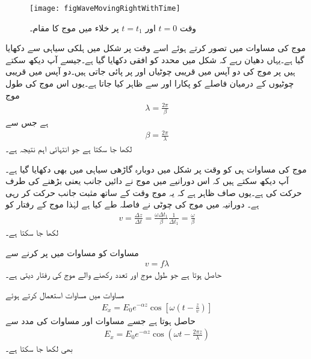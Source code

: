 \begin{figure}
\centering
\texttt{[image: figWaveMovingRightWithTime]}
\caption{وقت $t=0$ اور $t=t_1$ پر خلاء میں موج کا مقام۔}
\label{شکل_موج_وقت_کے_ساتھ_مثبت_چلتی_موج}
\end{figure}


موج کی مساوات  میں  تصور کرتے ہوئے اسے وقت  پر شکل  میں ہلکی سیاہی سے دکھایا گیا ہے۔یہاں دھیان رہے کہ شکل میں  محدد کو افقی دکھایا گیا ہے۔جیسے آپ دیکھ سکتے ہیں  پر موج کی دو آپس میں قریبی چوٹیاں  اور  پر پائی جاتی ہیں۔دو آپس میں قریبی چوٹیوں کے درمیان فاصلے کو  پکارا اور  سے ظاہر کیا جاتا ہے۔یوں اس موج کی طول موج
\begin{align}\label{مساوات_موج_زاویائی_مستقل_اور_طول_موج_الف}
\lambda=\frac{2\pi}{\beta}
\end{align}
ہے جس سے
\begin{align}\label{مساوات_موج_زاویائی_مستقل_اور_طول_موج_ب}
\beta=\frac{2\pi}{\lambda}
\end{align}
لکھا جا سکتا ہے جو انتہائی اہم نتیجہ ہے۔

موج کی مساوات ہی کو وقت  پر شکل  میں دوبارہ گاڑھی سیاہی میں بھی دکھایا گیا ہے۔آپ دیکھ سکتے ہیں کہ اس دورانیے میں موج نے دائیں جانب یعنی  بڑھنے کی طرف حرکت کی ہے۔یوں صاف ظاہر ہے کہ یہ موج وقت کے ساتھ مثبت  جانب حرکت کر رہی ہے۔ دورانیہ  میں موج کی چوٹی نے  فاصلہ طے کیا ہے لہٰذا موج کے رفتار کو
\begin{align}\label{مساوات_موج_رفتار_اور_تعدد}
v=\frac{\Delta z}{\Delta t}=\frac{\omega \Delta t_1}{\beta} \frac{1}{\Delta t_1}=\frac{\omega}{\beta}
\end{align}
لکھا جا سکتا ہے۔

مساوات  کو  مساوات  میں پر کرنے سے
\begin{align}
v=f \lambda
\end{align}
حاصل ہوتا ہے جو  طول موج  اور  تعدد رکھنے والے موج کی رفتار  دیتی ہے۔

مساوات  میں مساوات  استعمال کرتے ہوئے
\begin{align}
E_x=E_0 e^{-\alpha z} \cos \left[ \omega \left(t-\frac{z}{v} \right)\right]
\end{align}
حاصل ہوتا ہے جسے مساوات  اور مساوات  کی مدد سے
\begin{align}
E_x=E_0 e^{-\alpha z} \cos \left(\omega  t-\frac{2 \pi z}{\lambda}\right)
\end{align}
بھی لکھا جا سکتا ہے۔

